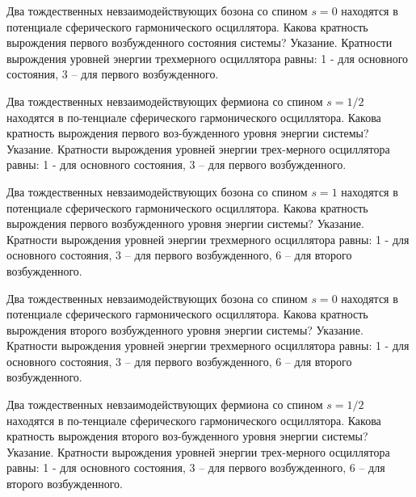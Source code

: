 \documentclass[11pt,a4paper]{exam}
\begin{document}
\begin{questions}
\question Два тождественных невзаимодействующих бозона со спином $s = 0$ находятся в потенциале сферического гармонического осциллятора. Какова кратность вырождения первого возбужденного состояния системы? Указание. Кратности вырождения уровней энергии трехмерного осциллятора равны: 1 - для основного состояния, 3 – для первого возбужденного. 
\begin{choices}
\end{choices}

\question Два тождественных невзаимодействующих фермиона со спином $s = 1/2$ находятся в по-тенциале сферического гармонического осциллятора. Какова кратность вырождения первого воз-бужденного уровня энергии системы? Указание. Кратности вырождения уровней энергии трех-мерного осциллятора равны: 1 - для основного состояния, 3 – для первого возбужденного.
\begin{choices}
\end{choices}

\question Два тождественных невзаимодействующих бозона со спином $s = 1$ находятся в потенциале сферического гармонического осциллятора. Какова кратность вырождения первого возбужденного уровня энергии системы? Указание. Кратности вырождения уровней энергии трехмерного осциллятора равны: 1 - для основного состояния, 3 – для первого возбужденного, 6 – для второго возбужденного.
\begin{choices}
\end{choices}

\question Два тождественных невзаимодействующих бозона со спином $s = 0$ находятся в потенциале сферического гармонического осциллятора. Какова кратность вырождения второго возбужденного уровня энергии системы? Указание. Кратности вырождения уровней энергии трехмерного осциллятора равны: 1 - для основного состояния, 3 – для первого возбужденного, 6 – для второго возбужденного.
\begin{choices}
\end{choices}

\question Два тождественных невзаимодействующих фермиона со спином $s = 1/2$ находятся в по-тенциале сферического гармонического осциллятора. Какова кратность вырождения второго воз-бужденного уровня энергии системы? Указание. Кратности вырождения уровней энергии трех-мерного осциллятора равны: 1 - для основного состояния, 3 – для первого возбужденного, 6 – для второго возбужденного.
\begin{choices}
\end{choices}


\end{questions}
\end{document}
